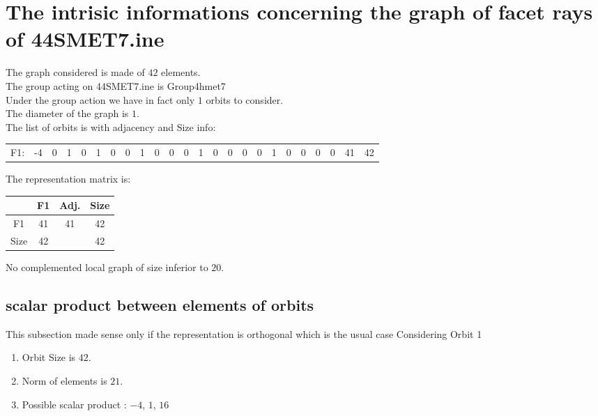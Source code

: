\documentclass[12pt]{article}
\begin{document}
\section{The intrisic informations concerning the graph of facet rays of 44SMET7.ine}
The graph considered is made of $42$ elements.\\
The group acting on 44SMET7.ine is Group4hmet7\\
Under the group action we have in fact only $1$ orbits to consider.\\
The diameter of the graph is $1$.\\
The list of orbits is with adjacency and Size info:
\begin{center}
\scriptsize
\begin{tabular}{cccccccccccccccccccccc|c|c}
F1:&-4&0&1&0&1&0&0&1&0&0&0&1&0&0&0&0&1&0&0&0&0&41&42\\
\end{tabular}
\end{center}
The representation matrix is:
\begin{center}
\scriptsize
\begin{tabular}{|c|c|c|c|}
\hline
&F1&Adj.&Size\\
\hline
F1& 41&41&42\\
\hline
Size&42&&42\\
\hline
\end{tabular}
\end{center}
No complemented local graph of size inferior to $20$.
\subsection{scalar product between elements of orbits}
\noindent This subsection made sense only if the representation is orthogonal which is the usual case
Considering Orbit 1
\begin{enumerate}
\item Orbit Size is $42$.
\item Norm of elements is $21$.
\item Possible scalar product : $-4$, $1$, $16$
\end{enumerate}
\end{document}
